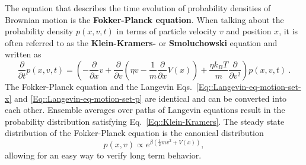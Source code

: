 	The equation that describes the time evolution of probability densities of Brownian motion is the \textbf{Fokker-Planck equation}. When talking about the probability density $p(x, v, t)$ in terms of particle velocity $v$ and position $x$, it is often referred to as the \textbf{Klein-Kramers-} or \textbf{Smoluchowski} equation and written as
	\begin{equation} \label{Eq::Klein-Kramers}
		\frac{\partial}{\partial t} p(x, v, t) = \left(-\frac{\partial}{\partial x} v + \frac{\partial}{\partial v} \left(\eta v - \frac{1}{m} \frac{\partial}{\partial x} V(x) \right) + \frac{\eta k_B T}{m} \frac{\partial}{\partial v^2}\right)p(x, v, t) ~.
	\end{equation}
	The Fokker-Planck equation and the Langevin Eqs.~\eqref{Eq::Langevin-eq-motion-set-x} and \eqref{Eq::Langevin-eq-motion-set-p} are identical and can be converted into each other. Ensemble averages over paths of Langevin equations result in the probability distribution satisfying Eq.~\eqref{Eq::Klein-Kramers}. The steady state distribution of the Fokker-Planck equation is the canonical distribution
	\begin{equation} \label{Eq::Canonical-Dist}
		p(x, v) \propto e^{\beta \left( \tfrac{1}{2} m v^2 + V(x)\right)},
	\end{equation}
	allowing for an easy way to verify long term behavior.
